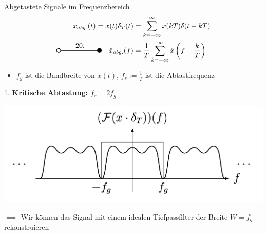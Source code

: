 \documentclass[14pt, aspectratio=169, handout]{beamer}
\newcommand{\transform}[2]{%
    \begin{tikzpicture}
        \draw[thick] (0,0) circle (0.1);
        \draw[thick] (0.1,0) -- (#2,0) node[midway, above] {#1};
        \filldraw[thick] (#2,0) circle (0.1);
    \end{tikzpicture}%
}
\begin{document}
\begin{frame}{Abgetastete Signale im Frequenzbereich}
\vspace*{-0.5cm}
\begin{align*}
    x_{abg.}(t) = x(t)\delta_T(t) &= \sum_{k=-\infty}^{\infty} x(kT)\delta(t-kT) \\
    \transform{20.}{2} \hspace{10pt} \hat{x}_{abg.}(f) &= \frac{1}{T} \sum_{k = -\infty}^\infty \hat{x}\left( f- \frac{k}{T} \right)
\end{align*}
    \vspace*{12pt}
    \begin{itemize}
        \item $f_g$ ist die Bandbreite von $x(t)$, $f_s := \displaystyle\frac{1}{T}$ ist die Abtastfrequenz
    \end{itemize}
\end{frame}

\begin{frame}{1. \textcolor{myblue}{\textbf{Kritische Abtastung: $f_s = 2 f_g$}}}
    \begin{center}
        \includegraphics[width=0.85\linewidth]{figures/krit_abtast.png}
    \end{center}
    $\implies$ Wir können das Signal mit einem idealen Tiefpassfilter der Breite $W = f_g$ rekonstruieren

\end{frame}
\end{document}
